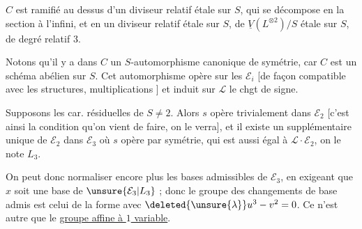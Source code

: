 $C$ est ramifié  au dessus d'un diviseur relatif  étale sur $S$, qui se décompose en la section à l'infini, et en un diviseur relatif  étale sur $S$,  de  $\underline V(L^{\otimes2})/S$ étale sur $S$, de degré relatif $3$.



Notons qu'il y a dans $C$ un $S$-automorphisme canonique de symétrie, car $C$ est un schéma abélien sur $S$. Cet automorphisme  opère sur les $\mathcal E_i$ [de façon compatible avec les structures, multiplications ] et induit sur $\mathcal L$ le chgt de signe.

Supposons les car. résiduelles de $S\neq2$. Alors
$s$ opère trivialement dans $\mathcal E_2$ [c'est ainsi  la condition qu'on vient de faire, on le verra], et il existe un supplémentaire unique  de $\mathcal E_2$ dans $\mathcal E_3$ où $s$ opère par symétrie,  qui est aussi égal à $\mathcal L\cdot \mathcal E_2$, on le note $L_3$.

On peut donc normaliser encore plus les bases admissibles de $\mathcal E_3$, en exigeant que $x$ soit une base de $\unsure{\mathcal E_3|L_3}$ ; donc le groupe des changements de base admis est celui de la forme
avec $\deleted{\unsure{\lambda}}u^3-v^2=0$.
Ce n'est autre que le \uline{groupe affine à $1$ variable}.

